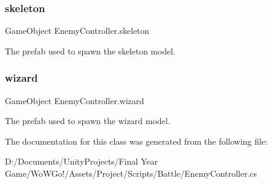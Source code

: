 \subsubsection{\texorpdfstring{skeleton}{skeleton}}
{\footnotesize\ttfamily Game\+Object Enemy\+Controller.\+skeleton}



The prefab used to spawn the skeleton model. 

\mbox{\label{class_enemy_controller_af94df5444352df3bd0751887b7e39c94}} 
\subsubsection{\texorpdfstring{wizard}{wizard}}
{\footnotesize\ttfamily Game\+Object Enemy\+Controller.\+wizard}



The prefab used to spawn the wizard model. 



The documentation for this class was generated from the following file\+:\begin{DoxyCompactItemize}
\item 
D\+:/\+Documents/\+Unity\+Projects/\+Final Year Game/\+Wo\+W\+Go!/\+Assets/\+Project/\+Scripts/\+Battle/Enemy\+Controller.\+cs\end{DoxyCompactItemize}
